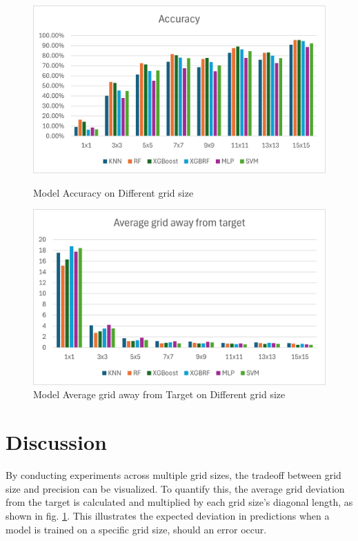 \documentclass[runningheads]{llncs}
\begin{document}
\vspace{-10pt}
\begin{figure}[hbt!]
	\begin{minipage}{0.45\textwidth}
		\centering
		\includegraphics[scale=0.5]{image3.png}
		\caption{Model Accuracy on Different grid size}
		\label{fig:acc_dgird_size}
	\end{minipage}
	\hfill
	\begin{minipage}{0.45\textwidth}
		\centering
		\includegraphics[scale=0.5]{image1.png}
		\caption{Model Average grid away from Target on Different grid size}
		\label{fig:AGT_dgrid_size}
	\end{minipage}
\end{figure}

\vspace{-30pt}
\section{Discussion}
By conducting experiments across multiple grid sizes, the tradeoff between grid size and precision can be visualized. To quantify this, the average grid deviation from the target is calculated and multiplied by each grid size's diagonal length, as shown in fig. \ref{fig:AGT_dgrid_size}. This illustrates the expected deviation in predictions when a model is trained on a specific grid size, should an error occur.
\end{document}
